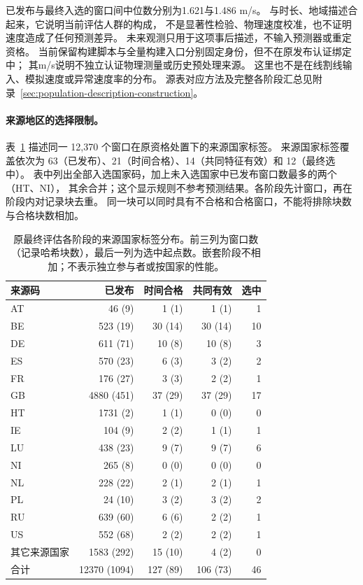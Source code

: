 已发布与最终入选的窗口间中位数分别为1.621与1.486 m/s。
与时长、地域描述合起来，它说明当前评估人群的构成，
不是显著性检验、物理速度校准，也不证明速度造成了任何预测差异。
未来观测只用于这项事后描述，不输入预测器或重定资格。
当前保留构建脚本与全量构建入口分别固定身份，但不在原发布认证绑定中；
其m/s说明不独立认证物理测量或历史预处理来源。
这里也不是在线割线输入、模拟速度或异常速度率的分布。
源表对应方法及完整各阶段汇总见附录~\ref{sec:population-description-construction}。

\paragraph{来源地区的选择限制。}\label{sec:final-cohort-geography}\hypertarget{sec:final-cohort-geography}{}
表~\ref{tab:final-cohort-geography} 描述同一 12,370 个窗口在原资格处置下的来源国家标签。
来源国家标签覆盖依次为
63（已发布）、21（时间合格）、14（共同特征有效）和 12（最终选中）。
表中列出全部入选国家码，加上未入选国家中已发布窗口数最多的两个（HT、NI），
其余合并；这个显示规则不参考预测结果。各阶段先计窗口，再在阶段内对记录块去重。
同一块可以同时具有不合格和合格窗口，不能将排除块数与合格块数相加。

\begin{table}[htbp]
\centering\small
\caption{原最终评估各阶段的来源国家标签分布。前三列为窗口数（记录哈希块数），最后一列为选中起点数。嵌套阶段不相加；不表示独立参与者或按国家的性能。}
\label{tab:final-cohort-geography}\hypertarget{tab:final-cohort-geography}{}
\begin{tabular}{@{}lrrrr@{}}
\toprule
来源码 & 已发布 & 时间合格 & 共同有效 & 选中\\
\midrule
AT & 46 (9) & 1 (1) & 1 (1) & 1\\
BE & 523 (19) & 30 (14) & 30 (14) & 10\\
DE & 611 (71) & 10 (8) & 10 (8) & 3\\
ES & 570 (23) & 6 (3) & 3 (2) & 2\\
FR & 176 (27) & 3 (3) & 2 (2) & 1\\
GB & 4880 (451) & 37 (29) & 37 (29) & 17\\
HT & 1731 (2) & 1 (1) & 0 (0) & 0\\
IE & 104 (9) & 2 (2) & 1 (1) & 1\\
LU & 438 (23) & 9 (7) & 9 (7) & 6\\
NI & 265 (8) & 0 (0) & 0 (0) & 0\\
NL & 228 (22) & 2 (1) & 2 (1) & 1\\
PL & 24 (10) & 3 (2) & 3 (2) & 2\\
RU & 639 (60) & 6 (6) & 2 (2) & 1\\
US & 552 (68) & 2 (2) & 2 (2) & 1\\
其它来源国家 & 1583 (292) & 15 (10) & 4 (2) & 0\\
合计 & 12370 (1094) & 127 (89) & 106 (73) & 46\\
\bottomrule
\end{tabular}
\end{table}

